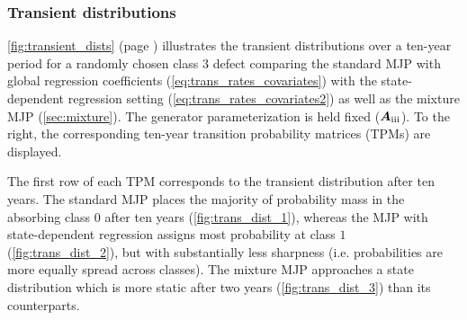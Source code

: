 \documentclass{article}
\newcommand{\RN}[1]{\textup{\uppercase\expandafter{\romannumeral#1}}}
\begin{document}
\subsubsection{Transient distributions}

\cref{fig:transient_dists} (page \pageref{fig:transient_dists}) illustrates the transient distributions over a ten-year period for a randomly chosen class $3$ defect
comparing the standard MJP with global regression coefficients (\cref{eq:trans_rates_covariates}) with the state-dependent regression setting (\cref{eq:trans_rates_covariates2}) as well as the mixture MJP (\cref{sec:mixture}). The generator parameterization is held fixed ($\bm{A}_{\RN{3}}$). To the right, the corresponding ten-year transition probability matrices (TPMs) are displayed.



The first row of each TPM corresponds to the transient distribution after ten years. 
The standard MJP places the majority of probability mass in the absorbing class $0$ after ten years (\cref{fig:trans_dist_1}), whereas the MJP with state-dependent regression assigns most probability at class $1$ (\cref{fig:trans_dist_2}), but with substantially less sharpness (i.e. probabilities are more equally spread across classes). The mixture MJP approaches a state distribution which is more static after two years (\cref{fig:trans_dist_3}) than its counterparts.
\end{document}
